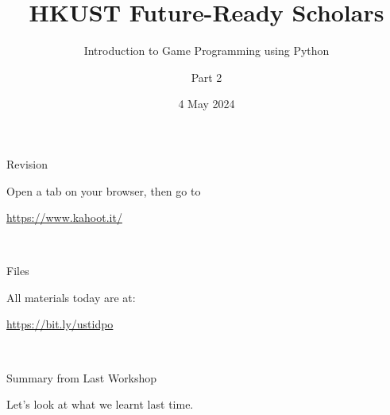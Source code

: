 \documentclass[dvipsnames, svgnames, x11names]{beamer}
\title[HKUST Future-Ready Scholars]{HKUST Future-Ready Scholars}
\subtitle{Introduction to Game Programming using Python}
\author[Game Programming using Python]{Part 2}
\date[May 2024]{4 May 2024}
\begin{document}

\frame{\titlepage}

\begin{frame}[fragile]{Revision}
    \begin{center}
        Open a tab on your browser, then go to

        \href{https://www.kahoot.it/}{https://www.kahoot.it/}

        \

    \end{center}
\end{frame}

\begin{frame}[fragile]{Files}
    \begin{center}
        All materials today are at:

        \href{https://bit.ly/ustidpo}{https://bit.ly/ustidpo}

        \


    \end{center}
\end{frame}    

\begin{frame}[fragile]{Summary from Last Workshop}
    \begin{center}
        Let's look at what we learnt last time.
    \end{center}
\end{frame}
\end{document}
